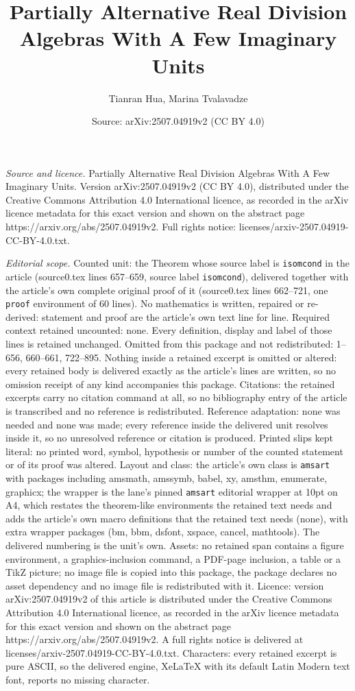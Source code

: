 \documentclass[10pt,a4paper]{amsart}
\title[Partially Alternative Real Division Algebras With A Few Imag]{Partially Alternative Real Division Algebras With A Few Imaginary Units}
\author{Tianran Hua, Marina Tvalavadze}
\date{Source: arXiv:2507.04919v2 (CC BY 4.0)}
\begin{document}
\maketitle

\noindent\emph{Source and licence.} Partially Alternative Real Division Algebras With A Few Imaginary Units. Version arXiv:2507.04919v2 (CC BY 4.0), distributed under the Creative Commons Attribution 4.0 International licence, as recorded in the arXiv licence metadata for this exact version and shown on the abstract page https://arxiv.org/abs/2507.04919v2. Full rights notice: licenses/arxiv-2507.04919-CC-BY-4.0.txt.\par\smallskip

\noindent\textit{Editorial scope.} Counted unit: the Theorem whose source label is \texttt{isomcond} in the article (source0.tex lines 657--659, source label \texttt{isomcond}), delivered together with the article's own complete original proof of it (source0.tex lines 662--721, one \texttt{proof} environment of 60 lines). No mathematics is written, repaired or re-derived: statement and proof are the article's own text line for line. Required context retained uncounted: none. Every definition, display and label of those lines is retained unchanged. Omitted from this package and not redistributed: 1--656, 660--661, 722--895. Nothing inside a retained excerpt is omitted or altered: every retained body is delivered exactly as the article's lines are written, so no omission receipt of any kind accompanies this package. Citations: the retained excerpts carry no citation command at all, so no bibliography entry of the article is transcribed and no reference is redistributed. Reference adaptation: none was needed and none was made; every reference inside the delivered unit resolves inside it, so no unresolved reference or citation is produced. Printed slips kept literal: no printed word, symbol, hypothesis or number of the counted statement or of its proof was altered. Layout and class: the article's own class is \texttt{amsart} with packages including amsmath, amssymb, babel, xy, amsthm, enumerate, graphicx; the wrapper is the lane's pinned \texttt{amsart} editorial wrapper at 10pt on A4, which restates the theorem-like environments the retained text needs and adds the article's own macro definitions that the retained text needs (none), with extra wrapper packages (bm, bbm, dsfont, xspace, cancel, mathtools). The delivered numbering is the unit's own. Assets: no retained span contains a figure environment, a graphics-inclusion command, a PDF-page inclusion, a table or a TikZ picture; no image file is copied into this package, the package declares no asset dependency and no image file is redistributed with it. Licence: version arXiv:2507.04919v2 of this article is distributed under the Creative Commons Attribution 4.0 International licence, as recorded in the arXiv licence metadata for this exact version and shown on the abstract page https://arxiv.org/abs/2507.04919v2. A full rights notice is delivered at licenses/arxiv-2507.04919-CC-BY-4.0.txt. Characters: every retained excerpt is pure ASCII, so the delivered engine, XeLaTeX with its default Latin Modern text font, reports no missing character.
\end{document}
